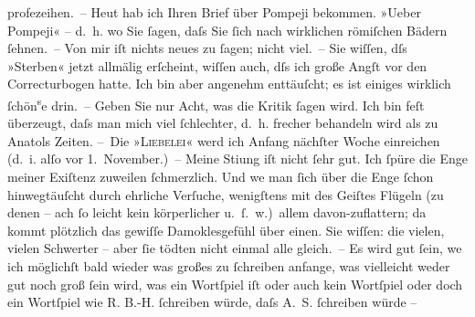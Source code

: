 \begin{ledgroupsized}[t]{13cm}
               profezeihen. – Heut hab ich Ihren Brief über Pompeji bekommen. »Ueber Pompeji« –
               d. h. wo Sie ſagen, daſs Sie ſich nach wirklichen römiſchen Bädern ſehnen. –\pend
           \pstart
           Von mir iſt nichts neues zu ſagen; nicht viel. – Sie wiſſen, dſs »Sterben« jetzt allmälig erſcheint, wiſſen auch, dſs ich große
               Angſt vor den Correctur{\pb}bogen hatte. Ich bin aber
               angenehm enttäuſcht; es ist einiges wirklich ſchön\substVorne{}\textsuperscript{s}\substDazwischen{}e\substHinten{} drin. – Geben Sie nur Acht, was die Kritik ſagen wird. Ich bin feſt
               überzeugt, daſs man mich viel ſchlechter, d. h. frecher behandeln wird als zu Anatols Zeiten.\pend
           \pstart
           – Die »\textsc{Liebelei}« werd ich Anfang nächſter Woche einreichen (d. i. alſo vor
                  1. November.) –\pend
           \pstart
           Meine Sti{\geminationm}ung iſt nicht ſehr gut. Ich ſpüre die Enge
               meiner Exiſtenz zuweilen ſchmerzlich. Und we{\geminationn} man ſich
               über die Enge ſchon hinwegtäuſcht durch ehrliche Verſuche, wenigſtens mit des Geiſtes
               Flügeln (zu denen – ach ſo leicht kein körperlicher u. ſ. w.) allem davon-zu{\pb}flattern; da kommt plötzlich das gewiſſe
               Damoklesgefühl über einen. Sie wiſſen: die vielen, vielen Schwerter – aber ſie tödten
               nicht einmal alle gleich. –\pend
           \pstart
           Es wird gut ſein, we{\geminationn} ich möglichſt bald wieder was
               großes zu ſchreiben anfange, was vielleicht weder gut noch groß ſein wird, was ein
               Wortſpiel iſt oder auch kein Wortſpiel oder doch ein Wortſpiel wie \textsc{R. B.-H.}{ }ſchreiben würde, daſs A. S. ſchreiben würde –\pend
           \pstart

\end{ledgroupsized}
